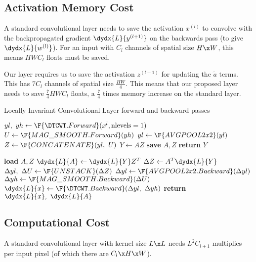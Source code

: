 \subsection{Activation Memory Cost}
A standard convolutional layer needs to save the activation $x^{(l)}$ to
convolve with the backpropagated gradient $\dydx{L}{y^{(l+1)}}$ on the backwards
pass (to give $\dydx{L}{w^{(l)}}$). For an input with $C_l$ channels of spatial size $H\x W$, this means
$HWC_l$ floats must be saved. 

Our layer requires us to save the activation
$z^{(l+1)}$ for updating the $\tilde{a}$ terms. This has $7C_l$ channels of
spatial size $\frac{HW}{4}$. This means that our proposed layer needs to save
$\frac{7}{4}HWC_l$ floats, a $\frac{7}{4}$ times memory increase on the standard
layer.

\begin{algorithm}[tb]
\caption{Locally Invariant Convolutional Layer forward and backward
passes}\label{alg:ch5:inv}
\begin{algorithmic}[1]
\State $yl,\ yh \gets \F{\DTCWT.Forward}(x^l, \mbox{nlevels}=1) $ 
  \State $U \gets \F{MAG\_SMOOTH.Forward}(yh)$ 
  \State $yl \gets \F{AVGPOOL2x2}(yl)$  
  \State $Z \gets \F{CONCATENATE}(yl,\ U)$ 
  \State $Y \gets AZ$ 
  \State \textbf{save} $A, Z$ 
  \State \textbf{return} $Y$ 
\EndProcedure
\end{algorithmic}\vspace{10pt}
\begin{algorithmic}[1]
  \State \textbf{load} $A, Z$
  \State $\dydx{L}{A} \gets \dydx{L}{Y} Z^T$ 
  \State $\Delta{Z} \gets A^T\dydx{L}{Y}$ 
  \State $\Delta yl,\ \Delta U \gets \F{UNSTACK}(\Delta Z)$ 
  \State $\Delta yl \gets \F{AVGPOOL2x2.Backward}(\Delta yl)$
  \State $\Delta yh \gets \F{MAG\_SMOOTH.Backward}(\Delta U)$
  \State $\dydx{L}{x} \gets \F{\DTCWT.Backward}(\Delta yl,\ \Delta yh)$ 
  \State \textbf{return} $\dydx{L}{x},\ \dydx{L}{A}$
\EndProcedure
\end{algorithmic}
\end{algorithm}


\subsection{Computational Cost}\label{sec:ch5:computation}
A standard convolutional layer with kernel size $L\x L$ needs $L^2C_{l+1}$
multiplies per input pixel (of which there are $C_{l}\x H\x W$).

